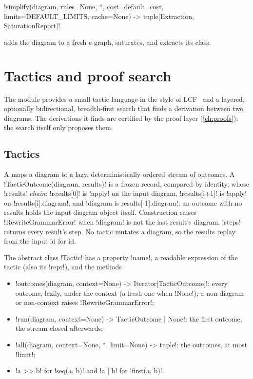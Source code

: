 \begin{signature}
\py!simplify(diagram, rules=None, *, cost=default_cost, limits=DEFAULT_LIMITS, cache=None) -> tuple[Extraction, SaturationReport]!
\end{signature}
adds the diagram to a fresh e-graph, saturates, and extracts its class.

\section{Tactics and proof search}\label{sec:rewriting-tactics}

The module  provides a small tactic language in the style of
LCF~\cite{gordon1979lcf} and a layered, optionally bidirectional, breadth-first search that finds a
derivation between two diagrams. The derivations it finds are certified by the proof layer
(\cref{ch:proofs}); the search itself only proposes them.

\subsection{Tactics}

\begin{definition}[Tactic]\label{def:rewriting-tactic}
A  maps a diagram to a lazy, deterministically ordered stream of outcomes. A
\py!TacticOutcome(diagram, results)! is a frozen record, compared by identity, whose
\py!results! \emph{chain}: \py!results[0]! is \py!apply! on the input diagram, \py!results[i+1]! is
\py!apply! on \py!results[i].diagram!, and \py!diagram is results[-1].diagram!; an outcome with no
results holds the input diagram object itself. Construction raises \py!RewriteGrammarError! when
\py!diagram! is not the last result's diagram. \py!steps! returns every result's step. No tactic
mutates a diagram, so the results replay from the input id for id.
\end{definition}

The abstract class \py!Tactic! has a property \py!name!, a readable expression of the tactic (also
its \py!repr!), and the methods
\begin{itemize}
\item \py!outcomes(diagram, context=None) -> Iterator[TacticOutcome]!: every outcome, lazily, under
  the context (a fresh one when \py!None!); a non-diagram or non-context raises
  \py!RewriteGrammarError!;
\item \py!run(diagram, context=None) -> TacticOutcome | None!: the first outcome, the stream closed
  afterwards;
\item \py!all(diagram, context=None, *, limit=None) -> tuple!: the outcomes, at most \py!limit!;
\item \py!a >> b! for \py!seq(a, b)! and \py!a | b! for \py!first(a, b)!.
\end{itemize}


